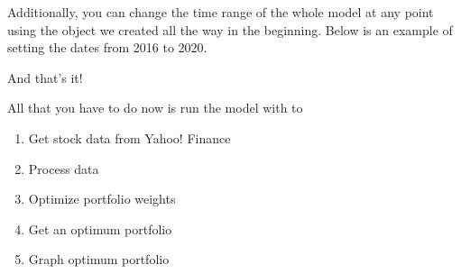 \documentclass[letterpaper,10pt,english]{sphinxmanual}
\begin{document}
\begin{sphinxVerbatim}[commandchars=\\\{\}]
    \PYGZbs{}
     \PYGZbs{}
      
\end{sphinxVerbatim}

Additionally, you can change the time range of the whole model at any point using the  object we created all the way in the beginning. Below is an example of setting the dates from 2016 to 2020.

\begin{sphinxVerbatim}[commandchars=\\\{\}]
\end{sphinxVerbatim}

And that’s it!

All that you have to do now is run the model with  to
\begin{enumerate}
%
\item {} 
Get stock data from Yahoo! Finance

\item {} 
Process data

\item {} 
Optimize portfolio weights

\item {} 
Get an optimum portfolio

\item {} 
Graph optimum portfolio

\end{enumerate}
\end{document}
